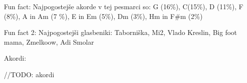 \begin{akordi}

    Fun fact:
    Najpogostejše akorde v tej pesmarci so:
    G (16\%), C(15\%), D (11\%), F (8\%), A in Am (7 \%), E in Em (5\%), Dm (3\%), Hm in F#m (2\%)

    Fun fact 2:
    Najpogostejši glasbeniki: Taborniška, Mi2, Vlado Kreslin, Big foot mama, Zmelkoow, Adi Smolar

    Akordi:

//TODO: akordi



    \pagebreak


\end{akordi}